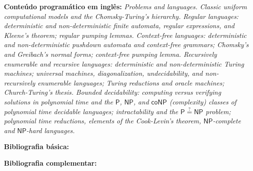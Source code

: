 \documentclass[class=article, crop=false]{standalone}
\begin{document}
\textbf{Conteúdo programático em inglês:}
\textit{
Problems and languages.
Classic uniform computational models and the Chomsky-Turing's hierarchy.
Regular languages: deterministic and non-deterministic finite automata, regular
expressions, and Kleene's theorem; regular pumping lemmas.
Context-free languages: deterministic and non-deterministic pushdown automata
and context-free grammars; Chomsky's and Greibach's normal forms; context-free
pumping lemma.
Recursively enumerable and recursive languages: deterministic and
non-deterministic Turing machines; universal machines, diagonalization,
undecidability, and non-recursively enumerable languages; Turing reductions and
oracle machines; Church-Turing's thesis.
Bounded decidability: computing versus verifying solutions in polynomial time
and the $\mathsf{P}$, $\mathsf{NP}$, and $\mathsf{coNP}$ (complexity) classes
of polynomial time decidable languages; intractability and the
$\mathsf{P}\stackrel{?}{=}\mathsf{NP}$ problem; polynomial time reductions,
elements of the Cook-Levin's theorem, $\mathsf{NP}$-complete and
$\mathsf{NP}$-hard languages.
}

\newrefsection
\textbf{Bibliografia básica:}
\nocite{2013-sipser,1998-lewis-papadimitriou,2006-hopcroft-etal}
\printbibliography

\newrefsection
\textbf{Bibliografia complementar:}
\nocite{2006-anderson,2019-crespi-reghizzi-etal,2010-goldreich,1997-kozen,2008-shallit} 
\printbibliography
\end{document}
